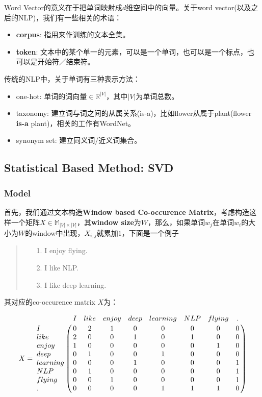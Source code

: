 \documentclass{article}
\begin{document}
Word Vector的意义在于把单词映射成$d$维空间中的向量。关于word vector(以及之后的NLP)，我们有一些相关的术语：

\begin{itemize}
	\item \textbf{corpus}: 指用来作训练的文本全集。
	\item \textbf{token}: 文本中的某个单一的元素，可以是一个单词，也可以是一个标点，也可以是开始符／结束符。
\end{itemize}

传统的NLP中，关于单词有三种表示方法：

\begin{itemize}
	\item one-hot: 单词的词向量$\in \mathbb{R}^{\lvert V\rvert}$，其中$\lvert V\rvert$为单词总数。
	\item taxonomy: 建立词与词之间的从属关系(is-a)，比如flower从属于plant(flower \textbf{is-a} plant)，相关的工作有WordNet。
	\item synonym set: 建立同义词/近义词集合。
\end{itemize}

\subsection{Statistical Based Method: SVD}

\subsubsection*{Model}

首先，我们通过文本构造\textbf{Window based Co-occurence Matrix}，考虑构造这样一个矩阵$X \in \mathbb{M}_{\lvert V\rvert \times \lvert V\rvert}$，其\textbf{window size}为$W$，那么，如果单词$w_j$在单词$w_i$的大小为$W$的window中出现，$X_{i,j}$就累加$1$，下面是一个例子

\begin{quote}
\begin{itemize}
	\item[1.] I enjoy flying.
	\item[2.] I like NLP.
	\item[3.] I like deep learning.
\end{itemize}
\end{quote}

其对应的co-occurence matrix $X$为：

\begin{equation}X=\label{cooccurence_matrix}\bordermatrix{
& I & like & enjoy & deep & learning & NLP & flying & .\cr
       I & 0 & 2 & 1 & 0 & 0 & 0 & 0 & 0\cr
    like & 2 & 0 & 0 & 1 & 0 & 1 & 0 & 0\cr
   enjoy & 1 & 0 & 0 & 0 & 0 & 0 & 1 & 0\cr
    deep & 0 & 1 & 0 & 0 & 1 & 0 & 0 & 0\cr
learning & 0 & 0 & 0 & 1 & 0 & 0 & 0 & 1\cr
     NLP & 0 & 1 & 0 & 0 & 0 & 0 & 0 & 1\cr
  flying & 0 & 0 & 1 & 0 & 0 & 0 & 0 & 1\cr
       . & 0 & 0 & 0 & 0 & 1 & 1 & 1 & 0
}\end{equation}
\end{document}
